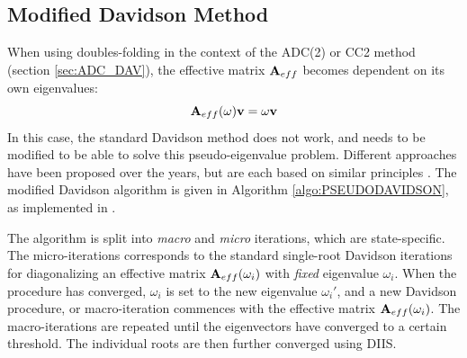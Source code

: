 \subsection{Modified Davidson Method}

When using doubles-folding in the context of the ADC(2) or CC2 method (section \ref{sec:ADC_DAV}), the effective matrix $\mathbf{A}_{eff}$ becomes dependent on its own eigenvalues:
\begin{equation}
\mathbf{A}_{eff}(\omega) \mathbf{v} = \omega \mathbf{v}
\end{equation}
\noindent In this case, the standard Davidson method does not work, and needs to be modified to be able to solve this pseudo-eigenvalue problem. Different approaches have been proposed over the years, but are each based on similar principles \cite{Kat2009,Win2011}. The modified Davidson algorithm is given in Algorithm \ref{algo:PSEUDODAVIDSON}, as implemented in \mchem{}. 

The algorithm is split into \emph{macro} and \emph{micro} iterations, which are state-specific. The micro-iterations corresponds to the standard single-root Davidson iterations for diagonalizing an effective matrix $\mathbf{A}_{eff}(\omega_i)$ with \emph{fixed} eigenvalue $\omega_i$. When the procedure has converged, $\omega_i$ is set to the new eigenvalue $\omega_i'$, and a new Davidson procedure, or macro-iteration commences with the effective matrix $\mathbf{A}_{eff}(\omega_i)$. The macro-iterations are repeated until the eigenvectors have converged to a certain threshold. The individual roots are then further converged using DIIS.

